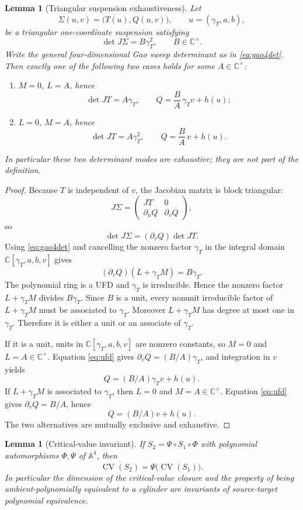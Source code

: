 \documentclass[11pt]{article}
\newtheorem{lemma}[theorem]{Lemma}
\theoremstyle{definition}
\newcommand{\A}{\mathbb A}
\newcommand{\C}{\mathbb C}
\newcommand{\CV}{\operatorname{CV}}
\begin{document}
\begin{lemma}[Triangular suspension exhaustiveness]\label{lem:det}
Let
\[
\Sigma(u,v)=\bigl(T(u),Q(u,v)\bigr),
\qquad u=(\gamma_T,a,b),
\]
be a triangular one-coordinate suspension satisfying
\[
\det J\Sigma=B\gamma_T^2,
\qquad B\in\C^\times.
\]
Write the general four-dimensional Gao sweep determinant as in \eqref{eq:gao4det}. Then exactly one of the following two cases holds for some $A\in\C^\times$:
\begin{enumerate}[label=(\Alph*)]
\item $M=0$, $L=A$, hence
\[
\det JT=A\gamma_T,
\qquad
Q=\frac BA\,\gamma_T v+h(u);
\]
\item $L=0$, $M=A$, hence
\[
\det JT=A\gamma_T^2,
\qquad
Q=\frac BA\,v+h(u).
\]
\end{enumerate}
In particular these two determinant modes are exhaustive; they are not part of the definition.
\end{lemma}

\begin{proof}
Because $T$ is independent of $v$, the Jacobian matrix is block triangular:
\[
J\Sigma=
\begin{pmatrix}
JT&0\\
\partial_uQ&\partial_vQ
\end{pmatrix},
\]
so
\[
\det J\Sigma=(\partial_vQ)\det JT.
\]
Using \eqref{eq:gao4det} and cancelling the nonzero factor $\gamma_T$ in the integral domain $\C[\gamma_T,a,b,v]$ gives
\begin{equation}
(\partial_vQ)(L+\gamma_T M)=B\gamma_T.
\label{eq:ufd}
\end{equation}
The polynomial ring is a UFD and $\gamma_T$ is irreducible. Hence the nonzero factor $L+\gamma_T M$ divides $B\gamma_T$. Since $B$ is a unit, every nonunit irreducible factor of $L+\gamma_T M$ must be associated to $\gamma_T$. Moreover $L+\gamma_T M$ has degree at most one in $\gamma_T$. Therefore it is either a unit or an associate of $\gamma_T$.

If it is a unit, units in $\C[\gamma_T,a,b,v]$ are nonzero constants, so $M=0$ and $L=A\in\C^\times$. Equation \eqref{eq:ufd} gives $\partial_vQ=(B/A)\gamma_T$, and integration in $v$ yields
\[
Q=(B/A)\gamma_T v+h(u).
\]
If $L+\gamma_T M$ is associated to $\gamma_T$, then $L=0$ and $M=A\in\C^\times$. Equation \eqref{eq:ufd} gives $\partial_vQ=B/A$, hence
\[
Q=(B/A)v+h(u).
\]
The two alternatives are mutually exclusive and exhaustive.
\end{proof}

\begin{lemma}[Critical-value invariant]\label{lem:equiv}
If $S_2=\Psi\circ S_1\circ\Phi$ with polynomial automorphisms $\Phi,\Psi$ of $\A^4$, then
\[
\overline{\CV(S_2)}=\Psi\bigl(\overline{\CV(S_1)}\bigr).
\]
In particular the dimension of the critical-value closure and the property of being ambient-polynomially equivalent to a cylinder are invariants of source-target polynomial equivalence.
\end{lemma}
\end{document}
